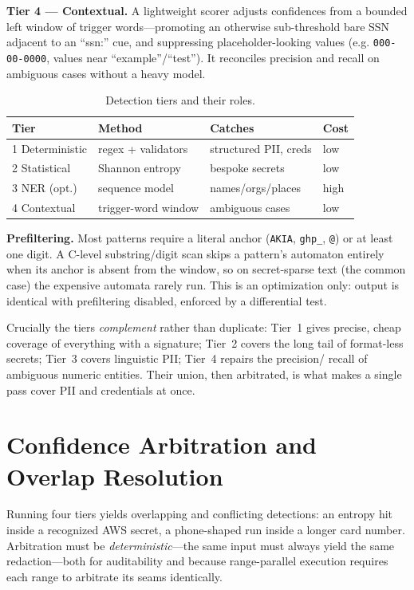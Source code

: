 \documentclass[conference]{IEEEtran}
\begin{document}
\textbf{Tier 4 --- Contextual.} A lightweight scorer adjusts confidences from a
bounded left window of trigger words---promoting an otherwise sub-threshold bare
SSN adjacent to an ``ssn:'' cue, and suppressing placeholder-looking values (e.g.
\texttt{000-00-0000}, values near ``example''/``test''). It reconciles precision
and recall on ambiguous cases without a heavy model.

\begin{table}[t]
\centering
\caption{Detection tiers and their roles.}
\label{tab:tiers}
\footnotesize
\begin{tabular}{@{}llll@{}}
\toprule
Tier & Method & Catches & Cost \\
\midrule
1 Deterministic & regex + validators & structured PII, creds & low \\
2 Statistical & Shannon entropy & bespoke secrets & low \\
3 NER (opt.) & sequence model & names/orgs/places & high \\
4 Contextual & trigger-word window & ambiguous cases & low \\
\bottomrule
\end{tabular}
\end{table}

\textbf{Prefiltering.} Most patterns require a literal anchor (\texttt{AKIA},
\texttt{ghp\_}, \texttt{@}) or at least one digit. A C-level substring/digit scan
skips a pattern's automaton entirely when its anchor is absent from the window, so
on secret-sparse text (the common case) the expensive automata rarely run. This is
an optimization only: output is identical with prefiltering disabled, enforced by a
differential test.

Crucially the tiers \emph{complement} rather than duplicate: Tier~1 gives precise,
cheap coverage of everything with a signature; Tier~2 covers the long tail of
format-less secrets; Tier~3 covers linguistic PII; Tier~4 repairs the precision/
recall of ambiguous numeric entities. Their union, then arbitrated, is what makes
a single pass cover PII and credentials at once.

\section{Confidence Arbitration and Overlap Resolution}\label{sec:arb}

Running four tiers yields overlapping and conflicting detections: an entropy hit
inside a recognized AWS secret, a phone-shaped run inside a longer card number.
Arbitration must be \emph{deterministic}---the same input must always yield the
same redaction---both for auditability and because range-parallel execution
requires each range to arbitrate its seams identically.
\end{document}
